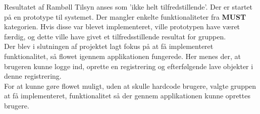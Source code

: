Resultatet af Rambøll Tilsyn anses som 'ikke helt tilfredstillende'. 
Der er startet på en prototype til systemet. Der mangler enkelte funktionaliteter fra \textbf{MUST} kategorien. Hvis disse var blevet implementeret, ville prototypen have været færdig, og dette ville have givet et tilfredsstillende resultat for gruppen. \\
Der blev i slutningen af projektet lagt fokus på at få implementeret funktionalitet, så flowet igennem applikationen fungerede. Her menes der, at brugeren kunne logge ind, oprette en registrering og efterfølgende lave objekter i denne registrering. \\
For at kunne gøre flowet muligt, uden at skulle hardcode brugere, valgte gruppen at få implementeret, funktionalitet så der gennem applikationen kunne oprettes brugere.